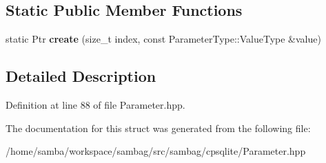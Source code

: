 \subsection*{Static Public Member Functions}
\begin{DoxyCompactItemize}
\item 
\hypertarget{structsambag_1_1cpsqlite_1_1_int64_parameter_aa33e2d8312c1e6f40044f5d4c7ec4fc5}{
static Ptr {\bfseries create} (size\_\-t index, const ParameterType::ValueType \&value)}
\label{structsambag_1_1cpsqlite_1_1_int64_parameter_aa33e2d8312c1e6f40044f5d4c7ec4fc5}

\end{DoxyCompactItemize}


\subsection{Detailed Description}


Definition at line 88 of file Parameter.hpp.



The documentation for this struct was generated from the following file:\begin{DoxyCompactItemize}
\item 
/home/samba/workspace/sambag/src/sambag/cpsqlite/Parameter.hpp\end{DoxyCompactItemize}

